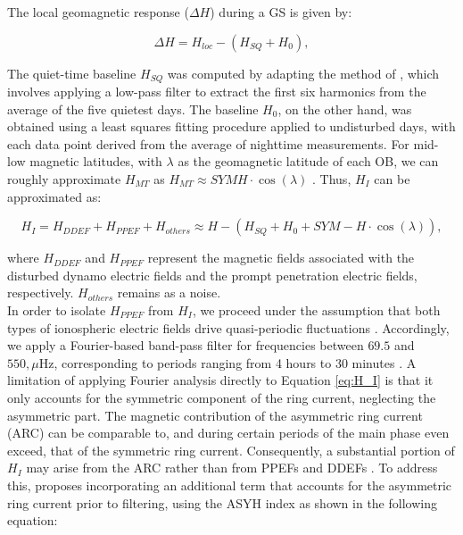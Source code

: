 \documentclass[a4paper]{article}
\theoremstyle{plain}
\theoremstyle{definition}
\begin{document}
	The local geomagnetic response ($\Delta H$) during a GS is given by:
	
	\begin{equation}
		\Delta H = H_{loc} - (H_{SQ} + H_0),
	\end{equation}
	

	\noindent The quiet-time baseline $H_{SQ}$ was computed by adapting the method of \cite{vanKampt}, which involves applying a low-pass filter to extract the first six harmonics from the average of the five quietest days. The baseline $H_0$, on the other hand, was obtained using a least squares fitting procedure applied to undisturbed days, with each data point derived from the average of nighttime measurements. For mid-low magnetic latitudes, with $\lambda$ as the geomagnetic latitude of each OB, we can roughly approximate $H_{MT}$ as $H_{MT} \approx SYMH \cdot \cos(\lambda)$ \citep{ddyn2005}. Thus, $H_I$ can be approximated as:  
	
	\begin{equation}
		\label{eq:H_I}
		H_I = H_{DDEF} + H_{PPEF} + H_{others} \approx H - (H_{SQ} + H_0 + SYM - H \cdot \cos(\lambda)),
	\end{equation}
	
	\noindent where $H_{DDEF}$ and $H_{PPEF}$ represent the magnetic fields associated with the disturbed dynamo electric fields and the prompt penetration electric fields, respectively. $H_{others}$ remains as a noise. \\
	
	
	In order to isolate $H_{PPEF}$ from $H_I$, we proceed under the assumption that both types of ionospheric electric fields drive quasi-periodic fluctuations \citep{nishida_68_fluctuations}. Accordingly, we apply a Fourier-based band-pass filter for frequencies between $69.5$ and $550 , \mu \text{Hz}$, corresponding to periods ranging from 4 hours to 30 minutes \citep{amory2020_filtros}. A limitation of applying Fourier analysis directly to Equation \ref{eq:H_I} is that it only accounts for the symmetric component of the ring current, neglecting the asymmetric part. The magnetic contribution of the asymmetric ring current (ARC) can be comparable to, and during certain periods of the main phase even exceed, that of the symmetric ring current. Consequently, a substantial portion of $H_I$ may arise from the ARC rather than from PPEFs and DDEFs \citep{Crooker1972, Fukushima1973, Iyemori1990}. To address this, \cite{amory2020_filtros} proposes incorporating an additional term that accounts for the asymmetric ring current prior to filtering, using the ASYH index as shown in the following equation:
	
\end{document}
